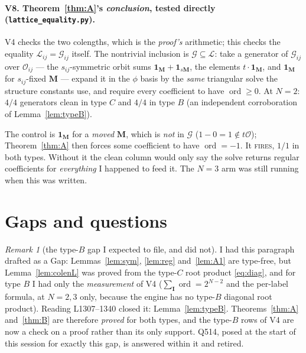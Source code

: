 \documentclass[11pt]{article}
\theoremstyle{plain}
\theoremstyle{definition}
\theoremstyle{remark}
\newtheorem{rem}[thm]{Remark}
\theoremstyle{plain}
\newcommand{\bI}{\mathbf{I}}
\newcommand{\bM}{\mathbf{M}}
\newcommand{\ord}{\operatorname{ord}}
\newcommand{\Lat}{\mathcal{L}}
\newcommand{\Gkm}{\mathcal{G}}
\begin{document}
\paragraph{V8. Theorem~\ref{thm:A}'s \emph{conclusion}, tested directly
(\texttt{lattice\_equality.py}).}
V4 checks the two colengths, which is the \emph{proof's} arithmetic; this checks
the equality $\Lat_{ij}=\Gkm_{ij}$ itself.  The nontrivial inclusion is
$\Gkm\subseteq\Lat$: take a generator of $\Gkm_{ij}$ over $\mathcal{O}_{ij}$ ---
the $s_{ij}$-symmetric orbit sums $\mathbf{1}_{\bM}+\mathbf{1}_{s\bM}$, the
elements $t\cdot\mathbf{1}_{\bM}$, and $\mathbf{1}_{\bM}$ for $s_{ij}$-fixed
$\bM$ --- expand it in the $\phi$ basis by the \emph{same} triangular solve the
structure constants use, and require every coefficient to have
$\ord\ge0$.  At $N=2$: $4/4$ generators clean in type $C$ and $4/4$ in type $B$
(an independent corroboration of Lemma~\ref{lem:typeB}).

The control is $\mathbf{1}_{\bM}$ for a \emph{moved} $\bM$, which is \emph{not}
in $\Gkm$ ($1-0=1\notin t\mathcal{O}$); Theorem~\ref{thm:A} then forces some
coefficient to have $\ord=-1$.  It \textsc{fires}, $1/1$ in both types.  Without
it the clean column would only say the solve returns regular coefficients for
\emph{everything} I happened to feed it.  The $N=3$ arm was still running when
this was written.

\section{Gaps and questions}

\begin{rem}[the type-$B$ gap I expected to file, and did not]\label{gap:B}
I had this paragraph drafted as a Gap: Lemmas~\ref{lem:sym}, \ref{lem:reg}
and~\ref{lem:A1} are type-free, but Lemma~\ref{lem:colenL} was proved from the
type-$C$ root product \eqref{eq:diag}, and for type $B$ I had only the
\emph{measurement} of V4 ($\sum_\bI\ord=2^{N-2}$ and the per-label formula, at
$N=2,3$ only, because the engine has no type-$B$ diagonal root product).  Reading
L1307--1340 closed it: Lemma~\ref{lem:typeB}.  Theorems~\ref{thm:A}
and~\ref{thm:B} are therefore \emph{proved} for both types, and the type-$B$ rows
of V4 are now a check on a proof rather than its only support.  Q514, posed at
the start of this session for exactly this gap, is answered within it and
retired.
\end{rem}
\end{document}
